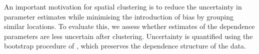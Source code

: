 \documentclass[12pt]{article}
\begin{document}
An important motivation for spatial clustering is to reduce the uncertainty in parameter estimates while minimising the introduction of bias by grouping similar locations. 
To evaluate this, we assess whether estimates of the dependence parameters are less uncertain after clustering. 
Uncertainty is quantified using the bootstrap procedure of \citet{Heffernan2004}, which preserves the dependence structure of the data. 
\end{document}
